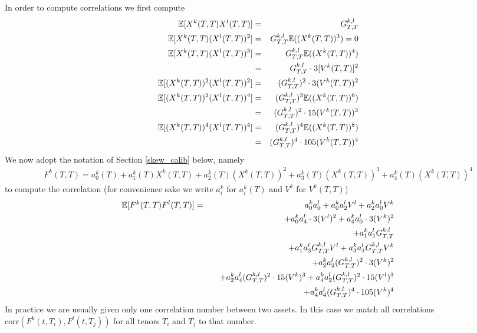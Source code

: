 \documentclass[12pt]{article}
\begin{document}
In order to compute correlations we first compute 
\begin{eqnarray*}
  \mathbb {E} [ X^k (T,T) X^l (T,T) ] & = & G^{k,l}_{T,T}
  \\
  \mathbb {E} [ X^k (T,T) ( X^l (T,T))^2 ] & = & G^{k,l}_{T,T} \mathbb {E} ( (X^k (T,T) )^3 ) = 0
  \\
  \mathbb {E} [ X^k (T,T) ( X^l (T,T))^3 ] & = & G^{k,l}_{T,T} \mathbb {E} ( (X^k (T,T) )^4 ) 
  \\
  & = & G^{k,l}_{T,T} \cdot 3 [ V^k (T,T) ]^2 
  \\
  \mathbb {E} [ ( X^k (T,T) )^2 ( X^l (T,T))^2 ] & = & ( G^{k,l}_{T,T})^2 \cdot 3 (V^k (T,T))^2
  \\
  \mathbb {E} [ ( X^k (T,T) )^2 ( X^l (T,T))^4 ] & = & ( G^{k,l}_{T,T})^2 \mathbb {E} ( (X^k (T,T))^6 ) 
  \\
  & = & ( G^{k,l}_{T,T})^2 \cdot 15 (V^k (T,T))^3 
  \\
  \mathbb {E} [ ( X^k (T,T) )^4 ( X^l (T,T))^4 ] & = & ( G^{k,l}_{T,T})^4 \mathbb {E} ( (X^k (T,T))^8 ) 
  \\
  & = & ( G^{k,l}_{T,T})^4 \cdot 105 (V^k (T,T))^4
\end{eqnarray*}
We now adopt the notation of Section \ref{skew_calib} below, namely 
\begin{eqnarray*}
  F^k(T,T) = a_0^k (T) + a_1^k (T) X^k (T,T) + a_2^k (T) (X^k (T,T))^2 + 
  a_3^k (T) (X^k (T,T))^3 + a_4^k (T) (X^k (T,T))^4 
\end{eqnarray*}
to compute the correlation (for convenience sake we write 
$a_i^k$ for $a_i^k (T)$ and $V^k $ for $V^k (T,T)$)
\begin{eqnarray*}
  \mathbb {E} [F^k (T,T) F^l (T,T)] & = & a_0^k  a_0^l  
  + a_0^k a_2^l V^l + a_2^k a_0^l V^k   
  \\
  &  & \quad 
  + a_0^k a_4^l \cdot 3 (V^l)^2 + a_4^k a_0^l \cdot 3 ( V^k )^2 
  \\
  &  & \quad 
  + a_1^k  a_1^l  G^{k,l}_{T,T}  
  \\
  &  & \quad 
  + a_1^k  a_3^l  G^{k,l}_{T,T} V^l  + a_3^k  a_1^l  G^{k,l}_{T,T} V^k  
  \\
  &  & \quad 
  + a_2^k  a_2^l  (G^{k,l}_{T,T} )^2 \cdot 3 ( V^k)^2 
  \\
  &  & \quad 
  + a_2^k  a_4^l  (G^{k,l}_{T,T} )^2 \cdot 15 ( V^k)^3  + 
  a_4^k  a_2^l  (G^{k,l}_{T,T} )^2 \cdot 15 ( V^l)^3 
  \\
  &  & \quad 
  + a_4^k  a_4^l  (G^{k,l}_{T,T} )^4 \cdot 105 ( V^k)^4 
\end{eqnarray*}
%
In practice we are usually given only one correlation number between two assets. In this case 
we match all correlations $\textrm {corr} (F^k (t, T_i), F^l (t, T_j)) $ for all tenors 
$T_i$ and $T_j$ to that number. 
\end{document}
